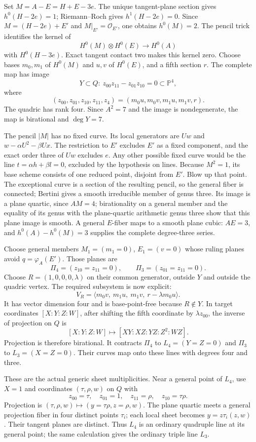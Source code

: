 Set \(M=A-E=H+E-3e\). The unique tangent-plane section gives \(h^0(H-2e)=1\); Riemann--Roch gives \(h^1(H-2e)=0\). Since \(M=(H-2e)+E'\) and \(M|_{E'}=\mathcal O_{E'}\), one obtains \(h^0(M)=2\). The pencil trick identifies the kernel of \[
H^0(M)\otimes H^0(E)\longrightarrow H^0(A)
\] with \(H^0(H-3e)\). Exact tangent contact two makes this kernel zero. Choose bases \(m_0,m_1\) of \(H^0(M)\) and \(u,v\) of \(H^0(E)\), and a fifth section \(r\). The complete map has image \[
Y\subset Q:\ z_{00}z_{11}-z_{01}z_{10}=0\subset\mathbb{P}^4,
\] where \[
(z_{00},z_{01},z_{10},z_{11},z_4)
=(m_0u,m_0v,m_1u,m_1v,r).
\] The quadric has rank four. Since \(A^2=7\) and the image is nondegenerate, the map is birational and \(\deg Y=7\).

The pencil \(|M|\) has no fixed curve. Its local generators are \(Uw\) and \(w-\alpha U^2-\beta Ux\). The restriction to \(E'\) excludes \(E'\) as a fixed component, and the exact order three of \(Uw\) excludes \(e\). Any other possible fixed curve would be the line \(t=\alpha h+\beta l=0\), excluded by the hypothesis on lines. Because \(M^2=1\), its base scheme consists of one reduced point, disjoint from \(E'\). Blow up that point. The exceptional curve is a section of the resulting pencil, so the general fiber is connected; Bertini gives a smooth irreducible member of genus three. Its image is a plane quartic, since \(AM=4\); birationality on a general member and the equality of its genus with the plane-quartic arithmetic genus three show that this plane image is smooth. A general \(E\)-fiber maps to a smooth plane cubic: \(AE=3\), and \(h^0(A)-h^0(M)=3\) supplies the complete degree-three series.

Choose general members \(M_1=(m_1=0)\), \(E_1=(v=0)\) whose ruling planes avoid \(q=\varphi_A(E')\). Those planes are \[
\Pi_4=(z_{10}=z_{11}=0),\qquad
\Pi_3=(z_{01}=z_{11}=0).
\] Choose \(R=(1,0,0,0,\lambda)\) on their common generator, outside \(Y\) and outside the quadric vertex. The required subsystem is now explicit: \[
V_R=\langle m_0v,\ m_1u,\ m_1v,\ r-\lambda m_0u\rangle.
\] It has vector dimension four and is base-point-free because \(R\notin Y\). In target coordinates \([X:Y:Z:W]\), after shifting the fifth coordinate by \(\lambda z_{00}\), the inverse of projection on \(Q\) is \[
[X:Y:Z:W]\longmapsto[XY:XZ:YZ:Z^2:WZ].
\] Projection is therefore birational. It contracts \(\Pi_4\) to \(L_4=(Y=Z=0)\) and \(\Pi_3\) to \(L_3=(X=Z=0)\). Their curves map onto these lines with degrees four and three.

These are the actual generic sheet multiplicities. Near a general point of \(L_4\), use \(X=1\) and coordinates \((\tau,\rho,w)\) on \(Q\) with \[
z_{00}=\tau,\quad z_{01}=1,\quad z_{11}=\rho,\quad
z_{10}=\tau\rho.
\] Projection is \((\tau,\rho,w)\mapsto(y=\tau\rho,z=\rho,w)\). The plane quartic meets a general projection fiber in four distinct points \(\tau_i\); each local sheet becomes \(y=z\tau_i(z,w)\). Their tangent planes are distinct. Thus \(L_4\) is an ordinary quadruple line at its general point; the same calculation gives the ordinary triple line \(L_3\).

